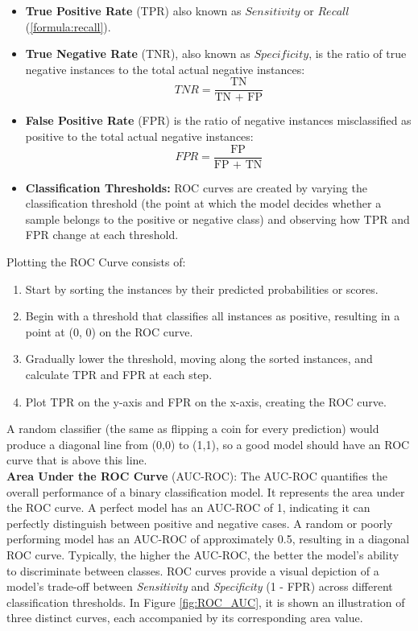 \begin{itemize}
  \item \textbf{True Positive Rate} (TPR) also known as $Sensitivity$ or $Recall$ (\ref{formula:recall}).
  
  \item \textbf{True Negative Rate} (TNR), also known as $Specificity$, is the ratio of true negative instances to the total actual negative instances:
  \begin{equation}
    \textit{TNR} = \frac{\text{TN}}{\text{TN + FP}}
    \label{formula:trueNegativeRate}
  \end{equation}

  \item \textbf{False Positive Rate} (FPR) is the ratio of negative instances misclassified as positive to the total actual negative instances:
  \begin{equation}
    \textit{FPR} = \frac{\text{FP}}{\text{FP + TN}}
    \label{formula:falsePositiveRate}
  \end{equation}

  \item \textbf{Classification Thresholds:} ROC curves are created by varying the classification threshold (the point at which the model decides whether a sample belongs to the positive or negative class) and observing how TPR and FPR change at each threshold.
\end{itemize}
Plotting the ROC Curve consists of:
\begin{enumerate}
  \item Start by sorting the instances by their predicted probabilities or scores.
  \item Begin with a threshold that classifies all instances as positive, resulting in a point at (0, 0) on the ROC curve.
  \item Gradually lower the threshold, moving along the sorted instances, and calculate TPR and FPR at each step.
  \item Plot TPR on the y-axis and FPR on the x-axis, creating the ROC curve.
\end{enumerate}
A random classifier (the same as flipping a coin for every prediction) would produce a diagonal line from (0,0) to (1,1), so a good model should have an ROC curve that is above this line.\\

\textbf{Area Under the ROC Curve} (AUC-ROC):
The AUC-ROC quantifies the overall performance of a binary classification model. It represents the area under the ROC curve.
A perfect model has an AUC-ROC of 1, indicating it can perfectly distinguish between positive and negative cases.
A random or poorly performing model has an AUC-ROC of approximately 0.5, resulting in a diagonal ROC curve.
Typically, the higher the AUC-ROC, the better the model's ability to discriminate between classes.
ROC curves provide a visual depiction of a model's trade-off between \textit{Sensitivity} and \textit{Specificity} (1 - FPR) across different classification thresholds.
In Figure \ref{fig:ROC_AUC}, it is shown an illustration of three distinct curves, each accompanied by its corresponding area value.\\

